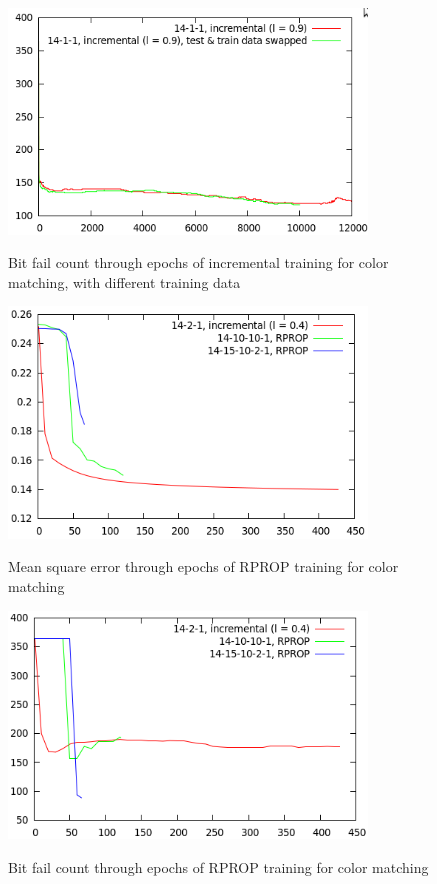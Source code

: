 \documentclass[times, utf8, zavrsni]{fer}
\begin{document}
\begin{figure}[htb]
\caption{Bit fail count through epochs of incremental training
for color matching, with different training data}
\centering
\includegraphics[width=0.85\textwidth]{images/color-train01-bf}
\label{fig:color-train-01-bf}
\end{figure}


\begin{figure}[htb]
\caption{Mean square error through epochs of RPROP training for color matching}
\centering
\includegraphics[width=0.85\textwidth]{images/color-train02-mse}
\label{fig:color-train-02-mse}
\end{figure}

\begin{figure}[htb]
\caption{Bit fail count through epochs of RPROP training for color matching}
\centering
\includegraphics[width=0.85\textwidth]{images/color-train02-bf}
\label{fig:color-train-02-bf}
\end{figure}
\end{document}
